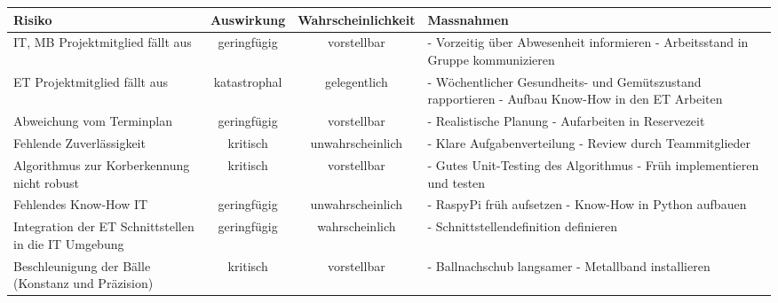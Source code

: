 \begin{landscape}
	\begin{table}
		\begin{tabular}{|p{5cm}|c|c|p{9cm}|}
			\hline Risiko & Auswirkung & Wahrscheinlichkeit & Massnahmen \\ 
			
			\hline \rowcolor{yellow} IT, MB Projektmitglied fällt aus & geringfügig & vorstellbar & 
			- Vorzeitig über Abwesenheit informieren \newline
			- Arbeitsstand in Gruppe kommunizieren \\ 
			
			\hline \rowcolor{red} ET Projektmitglied fällt aus & katastrophal & gelegentlich & 
			- Wöchentlicher Gesundheits- und Gemütszustand rapportieren \newline
			- Aufbau Know-How in den ET Arbeiten \\
			
			\hline \rowcolor{yellow} \hline Abweichung vom Terminplan & geringfügig & vorstellbar &
			- Realistische Planung \newline
			- Aufarbeiten in Reservezeit \\ 
			
			\hline \rowcolor{yellow} \hline Fehlende Zuverlässigkeit & kritisch & unwahrscheinlich &
			- Klare Aufgabenverteilung \newline
			- Review durch Teammitglieder \\ 
			
			\hline \rowcolor{yellow} \hline Algorithmus zur Korberkennung nicht robust & kritisch & vorstellbar &
			- Gutes Unit-Testing des Algorithmus \newline
			- Früh implementieren und testen \\
			
			\hline \rowcolor{green} \hline Fehlendes Know-How IT & geringfügig & unwahrscheinlich &
			- RaspyPi früh aufsetzen \newline
			- Know-How in Python aufbauen \\ 
			
			\hline \rowcolor{yellow} \hline Integration der ET Schnittstellen in die IT Umgebung & geringfügig & wahrscheinlich &
			- Schnittstellendefinition definieren  \\
		
			\hline \rowcolor{yellow} \hline Beschleunigung der Bälle (Konstanz und Präzision) & kritisch & vorstellbar &
			- Ballnachschub langsamer \newline
			- Metallband installieren \\ 
			

\end{tabular}
\end{table}
\end{landscape}

